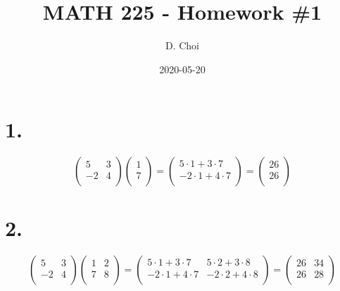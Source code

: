 \documentclass[12pt]{article}
\title{\vspace{-4\baselineskip}MATH 225 - Homework \#1}
\author{D. Choi}
\date{2020-05-20}
\begin{document}
\maketitle

\section*{1.}
\begin{equation*}
	\begin{pmatrix}
		5 & 3 \\
		-2 & 4 \\
	\end{pmatrix}
	\begin{pmatrix}
		1 \\
		7 \\
	\end{pmatrix}
	=
	\begin{pmatrix}
		5 \cdot 1 + 3 \cdot 7 \\
		-2 \cdot 1 + 4 \cdot 7 \\
	\end{pmatrix}
	=
	\boxed{
		\begin{pmatrix}
			26 \\
			26 \\
		\end{pmatrix}
	}
\end{equation*}

\section*{2.}
\begin{equation*}
	\begin{pmatrix}
		5 & 3 \\
		-2 & 4 \\
	\end{pmatrix}
	\begin{pmatrix}
		1 & 2 \\
		7 & 8 \\
	\end{pmatrix}
	=
	\begin{pmatrix}
		5 \cdot 1 + 3 \cdot 7 & 5 \cdot 2 + 3 \cdot 8 \\
		-2 \cdot 1 + 4 \cdot 7 & -2 \cdot 2 + 4 \cdot 8 \\
	\end{pmatrix}
	=
	\boxed{
		\begin{pmatrix}
			26 & 34 \\
			26 & 28 \\
		\end{pmatrix}
	}
\end{equation*}
\end{document}
